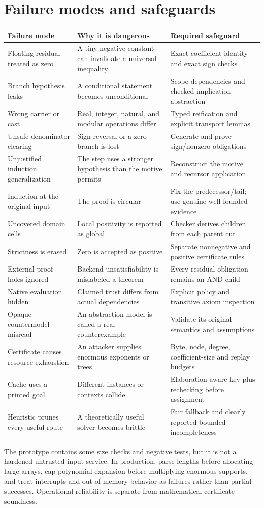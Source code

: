 \documentclass[11pt,letterpaper]{article}
\theoremstyle{definition}
\theoremstyle{remark}
\begin{document}
\section{Failure modes and safeguards}
\begin{longtable}{@{}p{}p{}p{}@{}}
\toprule
Failure mode & Why it is dangerous & Required safeguard \\
\midrule\endhead
Floating residual treated as zero & A tiny negative constant can invalidate a universal inequality & Exact coefficient identity and exact sign checks \\
Branch hypothesis leaks & A conditional statement becomes unconditional & Scope dependencies and checked implication abstraction \\
Wrong carrier or cast & Real, integer, natural, and modular operations differ & Typed reification and explicit transport lemmas \\
Unsafe denominator clearing & Sign reversal or a zero branch is lost & Generate and prove sign/nonzero obligations \\
Unjustified induction generalization & The step uses a stronger hypothesis than the motive permits & Reconstruct the motive and recursor application \\
Induction at the original input & The proof is circular & Fix the predecessor/tail; use genuine well-founded evidence \\
Uncovered domain cells & Local positivity is reported as global & Checker derives children from each parent cut \\
Strictness is erased & Zero is accepted as positive & Separate nonnegative and positive certificate rules \\
External proof holes ignored & Backend unsatisfiability is mislabeled a theorem & Every residual obligation remains an AND child \\
Native evaluation hidden & Claimed trust differs from actual dependencies & Explicit policy and transitive axiom inspection \\
Opaque countermodel misread & An abstraction model is called a real counterexample & Validate its original semantics and assumptions \\
Certificate causes resource exhaustion & An attacker supplies enormous exponents or trees & Byte, node, degree, coefficient-size and replay budgets \\
Cache uses a printed goal & Different instances or contexts collide & Elaboration-aware key plus rechecking before assignment \\
Heuristic prunes every useful route & A theoretically useful solver becomes brittle & Fair fallback and clearly reported bounded incompleteness \\
\bottomrule
\end{longtable}
The prototype contains some size checks and negative tests, but it is not a hardened untrusted-input service. In production, parse lengths before allocating large arrays, cap polynomial expansion before multiplying enormous supports, and treat interrupts and out-of-memory behavior as failures rather than partial successes. Operational reliability is separate from mathematical certificate soundness.
\end{document}
